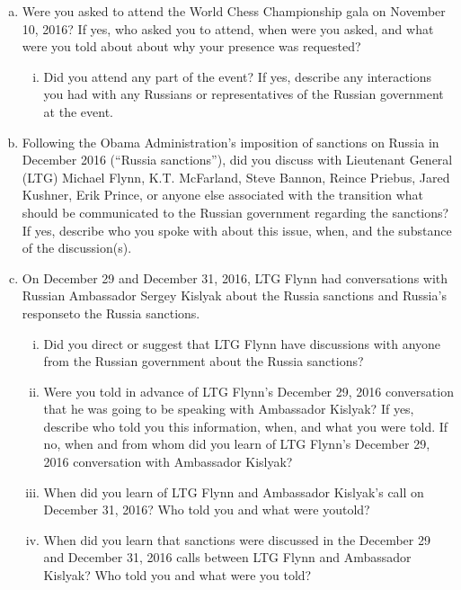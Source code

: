 \begin{enumerate}[a.]

\item Were you asked to attend the World Chess Championship gala on November 10, 2016?
If yes, who asked you to attend, when were you asked, and what were you told about about why your presence was requested?

\begin{enumerate}[i.]

\item Did you attend any part of the event?
If yes, describe any interactions you had with any Russians or representatives of the Russian government at the event.

\end{enumerate}

\item Following the Obama Administration’s imposition of sanctions on Russia in December 2016 (“Russia sanctions”), did you discuss with Lieutenant General (LTG) Michael Flynn, K.T. McFarland, Steve Bannon, Reince Priebus, Jared Kushner, Erik Prince, or anyone else associated with the transition what should be communicated to the Russian government regarding the sanctions?
If yes, describe who you spoke with about this issue, when, and the substance of the discussion(s).

\item On December 29 and December 31, 2016, LTG Flynn had conversations with Russian Ambassador Sergey Kislyak about the Russia sanctions and Russia’s responseto the Russia sanctions.

\begin{enumerate}[i.]

\item Did you direct or suggest that LTG Flynn have discussions with anyone from the Russian government about the Russia sanctions?

\item Were you told in advance of LTG Flynn’s December 29, 2016 conversation that he was going to be speaking with Ambassador Kislyak?
If yes, describe who told you this information, when, and what you were told.
If no, when and from whom did you learn of LTG Flynn’s December 29, 2016 conversation with Ambassador Kislyak?

\item When did you learn of LTG Flynn and Ambassador Kislyak’s call on December 31, 2016? Who told you and what were youtold?

\item When did you learn that sanctions were discussed in the December 29 and December 31, 2016 calls between LTG Flynn and Ambassador Kislyak?
Who told you and what were you told?


\end{enumerate}
\end{enumerate}
